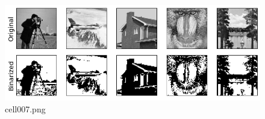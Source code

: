 \begin{figure}[ht]
	\centering
	\includegraphics[scale=0.8, max width=\linewidth]{./fig/energy-based-model/hopfield-model/cell007.png}
	\caption{cell007.png}
	\label{cell007.png}
\end{figure}